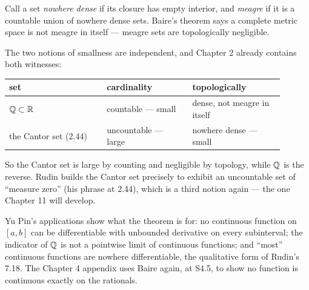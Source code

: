 \begin{deeper}
Call a set \emph{nowhere dense} if its closure has empty interior, and
\emph{meagre} if it is a countable union of nowhere dense sets. Baire's
theorem says a complete metric space is not meagre in itself --- meagre sets
are topologically negligible.

The two notions of smallness are independent, and Chapter 2 already contains
both witnesses:

\smallskip
\begin{tabular}{@{}p{0.32\linewidth}p{0.28\linewidth}p{0.30\linewidth}@{}}
\toprule
\textbf{set} & \textbf{cardinality} & \textbf{topologically} \\
\midrule
$\mathbb{Q} \subset \mathbb{R}$        & countable --- small & dense, not meagre in itself \\
the Cantor set (2.44)  & uncountable --- large & nowhere dense --- small \\
\bottomrule
\end{tabular}

\smallskip
So the Cantor set is large by counting and negligible by topology, while
$\mathbb{Q}$ is the reverse. Rudin builds the Cantor set precisely to exhibit an
uncountable set of ``measure zero'' (his phrase at 2.44), which is a third
notion again --- the one Chapter 11 will develop.

Yu Pin's applications show what the theorem is for: no continuous function on
$[a,b]$ can be differentiable with unbounded derivative on every
subinterval; the indicator of $\mathbb{Q}$ is not a pointwise limit of continuous
functions; and ``most'' continuous functions are nowhere differentiable, the
qualitative form of Rudin's 7.18. The Chapter 4 appendix uses Baire again, at
S4.5, to show no function is continuous exactly on the rationals.
\end{deeper}


